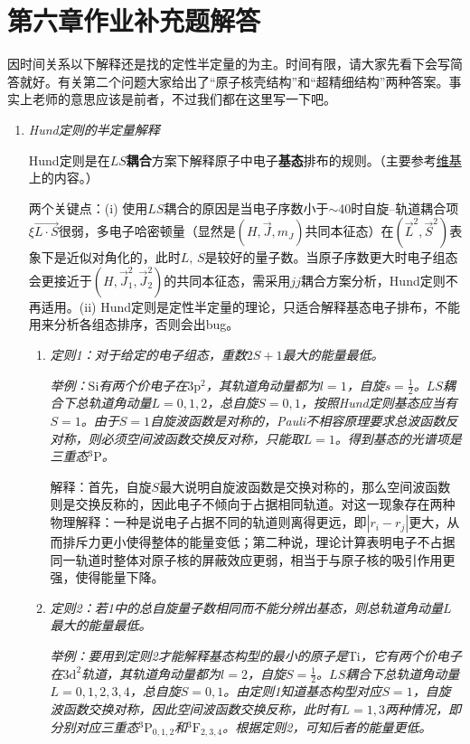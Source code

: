 \section{第六章作业补充题解答}
因时间关系以下解释还是找的定性半定量的为主。时间有限，请大家先看下会写简答就好。有关第二个问题大家给出了“原子核壳结构”和“超精细结构”两种答案。事实上老师的意思应该是前者，不过我们都在这里写一下吧。

\begin{enumerate}[label=\textbf{6.\Roman*}, listparindent=\parindent, leftmargin=-0.5mm]

\item \emph{Hund定则的半定量解释}


Hund定则是在\textbf{$LS$耦合}方案下解释原子中电子\textbf{基态}排布的规则。（主要参考\href{https://en.wikipedia.org/wiki/Hund\%27s_rules}{维基}上的内容。）

两个关键点：(i) 使用$LS$耦合的原因是当电子序数小于$\sim$40时自旋--轨道耦合项$\xi\vec{L\cdot S}$很弱，多电子哈密顿量（显然是$(H,\vec{J},m_J)$共同本征态）在$(\vec{L}^2,\vec{S}^2)$表象下是近似对角化的，此时$L,\,S$是较好的量子数。当原子序数更大时电子组态会更接近于$(H,\vec{J}_1^2,\vec{J}_2^2)$的共同本征态，需采用$jj$耦合方案分析，Hund定则不再适用。(ii) Hund定则是定性半定量的理论，只适合解释基态电子排布，不能用来分析各组态排序，否则会出bug。

\begin{enumerate}
    \item \emph{定则1：对于给定的电子组态，重数$2S+1$最大的能量最低。}
    
    \emph{举例：$\mathrm{Si}$有两个价电子在$\mathrm{3p^2}$，其轨道角动量都为$l=1$，自旋$s=\frac{1}{2}$。$LS$耦合下总轨道角动量$L=0,1,2$，总自旋$S=0,1$，按照Hund定则基态应当有$S=1$。由于$S=1$自旋波函数是对称的，Pauli不相容原理要求总波函数反对称，则必须空间波函数交换反对称，只能取$L=1$。得到基态的光谱项是三重态$\mathrm{^3P}$。}
    
    解释：首先，自旋$S$最大说明自旋波函数是交换对称的，那么空间波函数则是交换反称的，因此电子不倾向于占据相同轨道。对这一现象存在两种物理解释：一种是说电子占据不同的轨道则离得更远，即$|r_i-r_j|$更大，从而排斥力更小使得整体的能量变低；第二种说，理论计算表明电子不占据同一轨道时整体对原子核的屏蔽效应更弱，相当于与原子核的吸引作用更强，使得能量下降。
    
    \item \emph{定则2：若1中的总自旋量子数相同而不能分辨出基态，则总轨道角动量$L$最大的能量最低。}
    
    \emph{举例：要用到定则2才能解释基态构型的最小的原子是$\mathrm{Ti}$，它有两个价电子在$\mathrm{3d^2}$轨道，其轨道角动量都为$l=2$，自旋$S=\frac{1}{2}$。$LS$耦合下总轨道角动量$L=0,1,2,3,4$，总自旋$S=0,1$。由定则1知道基态构型对应$S=1$，自旋波函数交换对称，因此空间波函数交换反称，此时有$L=1,3$两种情况，即分别对应三重态$\mathrm{^3P_{0,1,2}}$和$\mathrm{^3F_{2,3,4}}$。根据定则2，可知后者的能量更低。}
    

\end{enumerate}
\end{enumerate}
